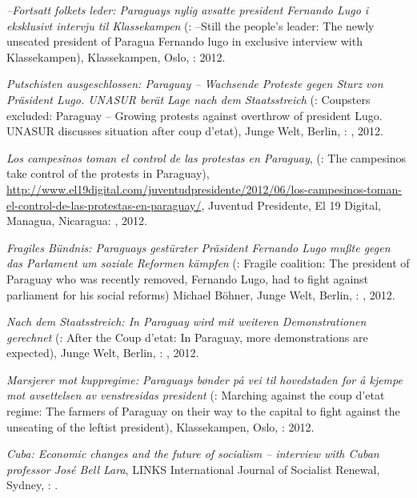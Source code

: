 \begin{itemize}
{\begin{itemize}
    \end{itemize}
\item \textit{--Fortsatt folkets leder: Paraguays nylig avsatte president Fernando Lugo i eksklusivt intervju til Klassekampen} (\english: --Still the people's leader: The newly unseated president of Paragua Fernando lugo in exclusive interview with Klassekampen), Klassekampen, Oslo, \Norway:  2012.
\item \textit{Putschisten ausgeschlossen: Paraguay -- Wachsende Proteste gegen Sturz von Präsident Lugo. UNASUR berät Lage nach dem Staatsstreich} (\english: Coupsters excluded: Paraguay -- Growing protests against overthrow of president Lugo. UNASUR discusses situation after coup d'etat), Junge Welt, Berlin, \Germany: , 2012.
\item \textit{Los campesinos toman el control de las protestas en Paraguay}, (\english: The campesinos take control of the protests in Paraguay), \href{http://www.el19digital.com/juventudpresidente/2012/06/los-campesinos-toman-el-control-de-las-protestas-en-paraguay/}{http://www.el19digital.com/juventudpresidente/2012/06/los-campesinos-toman-el-control-de-las-protestas-en-paraguay/}, Juventud Presidente, El 19 Digital, Managua, Nicaragua: , 2012.
\item \textit{Fragiles Bündnis: Paraguays gestürzter Präsident Fernando Lugo mußte gegen das Parlament um soziale Reformen kämpfen} (\english: Fragile coalition: The president of Paraguay who was recently removed, Fernando Lugo, had to fight against parliament for his social reforms) \with Michael Böhner, Junge Welt, Berlin, \Germany: , 2012.
\item \textit{Nach dem Staatsstreich: In Paraguay wird mit weiteren Demonstrationen gerechnet} (\english: After the Coup d'etat: In Paraguay, more demonstrations are expected), Junge Welt, Berlin, \Germany: , 2012.
\item \textit{Marsjerer mot kuppregime: Paraguays bønder på vei til hovedstaden for å kjempe mot avsettelsen av venstresidas president} (\english: Marching against the coup d'etat regime: The farmers of Paraguay on their way to the capital to fight against the unseating of the leftist president), Klassekampen, Oslo, \Norway:  2012.
\item \textit{Cuba: Economic changes and the future of socialism -- interview with Cuban professor José Bell Lara}, LINKS International Journal of Socialist Renewal, Sydney, \Australia: .
    \begin{itemize}

\end{itemize}}
\end{itemize}
